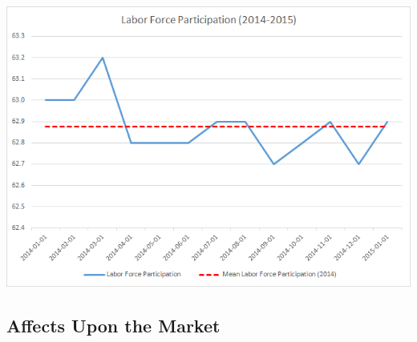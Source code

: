 \documentclass[11pt,letterpaper,english]{article}
\begin{document}
\includegraphics[scale=0.85]{LaborForceParticipation.png}

\subsection{Affects Upon the Market}
\end{document}
